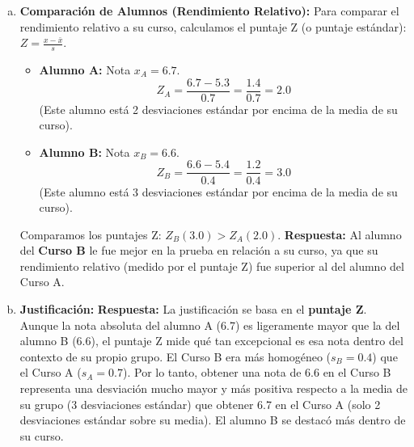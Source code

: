 \documentclass[10pt, a4paper]{article}
\newcommand{\mean}[1]{\ensuremath{\bar{#1}}} %
\newcommand{\stdev}{\ensuremath{s}} %
\begin{document}
\begin{enumerate}[a.]
    \item \textbf{Comparación de Alumnos (Rendimiento Relativo):}
    Para comparar el rendimiento relativo a su curso, calculamos el puntaje Z (o puntaje estándar): $Z = \frac{x - \mean{x}}{\stdev}$.
    \begin{itemize}[nosep]
        \item \textbf{Alumno A:} Nota $x_A = \num{6,7}$.
          \[ Z_A = \frac{\num{6,7} - \num{5,3}}{\num{0,7}} = \frac{\num{1,4}}{\num{0,7}} = \num{2,0} \]
          (Este alumno está 2 desviaciones estándar por encima de la media de su curso).
        \item \textbf{Alumno B:} Nota $x_B = \num{6,6}$.
          \[ Z_B = \frac{\num{6,6} - \num{5,4}}{\num{0,4}} = \frac{\num{1,2}}{\num{0,4}} = \num{3,0} \]
          (Este alumno está 3 desviaciones estándar por encima de la media de su curso).
    \end{itemize}
    Comparamos los puntajes Z: $Z_B (\num{3,0}) > Z_A (\num{2,0})$.
    \textbf{Respuesta:} Al alumno del \textbf{Curso B} le fue mejor en la prueba en relación a su curso, ya que su rendimiento relativo (medido por el puntaje Z) fue superior al del alumno del Curso A.

    \item \textbf{Justificación:}
    \textbf{Respuesta:} La justificación se basa en el \textbf{puntaje Z}. Aunque la nota absoluta del alumno A (\num{6,7}) es ligeramente mayor que la del alumno B (\num{6,6}), el puntaje Z mide qué tan excepcional es esa nota dentro del contexto de su propio grupo. El Curso B era más homogéneo ($\stdev_B=\num{0,4}$) que el Curso A ($\stdev_A=\num{0,7}$). Por lo tanto, obtener una nota de \num{6,6} en el Curso B representa una desviación mucho mayor y más positiva respecto a la media de su grupo (3 desviaciones estándar) que obtener \num{6,7} en el Curso A (solo 2 desviaciones estándar sobre su media). El alumno B se destacó más dentro de su curso.
\end{enumerate}
\end{document}
